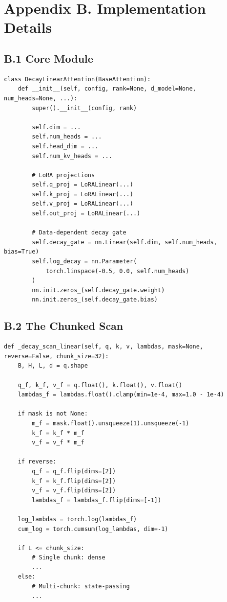 \section{Appendix B. Implementation Details}

\subsection{B.1 Core Module}

\begin{lstlisting}
class DecayLinearAttention(BaseAttention):
    def __init__(self, config, rank=None, d_model=None, num_heads=None, ...):
        super().__init__(config, rank)
        
        self.dim = ...
        self.num_heads = ...
        self.head_dim = ...
        self.num_kv_heads = ...
        
        # LoRA projections
        self.q_proj = LoRALinear(...)
        self.k_proj = LoRALinear(...)
        self.v_proj = LoRALinear(...)
        self.out_proj = LoRALinear(...)
        
        # Data-dependent decay gate
        self.decay_gate = nn.Linear(self.dim, self.num_heads, bias=True)
        self.log_decay = nn.Parameter(
            torch.linspace(-0.5, 0.0, self.num_heads)
        )
        nn.init.zeros_(self.decay_gate.weight)
        nn.init.zeros_(self.decay_gate.bias)
\end{lstlisting}

\subsection{B.2 The Chunked Scan}

\begin{lstlisting}
def _decay_scan_linear(self, q, k, v, lambdas, mask=None, reverse=False, chunk_size=32):
    B, H, L, d = q.shape
    
    q_f, k_f, v_f = q.float(), k.float(), v.float()
    lambdas_f = lambdas.float().clamp(min=1e-4, max=1.0 - 1e-4)
    
    if mask is not None:
        m_f = mask.float().unsqueeze(1).unsqueeze(-1)
        k_f = k_f * m_f
        v_f = v_f * m_f
    
    if reverse:
        q_f = q_f.flip(dims=[2])
        k_f = k_f.flip(dims=[2])
        v_f = v_f.flip(dims=[2])
        lambdas_f = lambdas_f.flip(dims=[-1])
    
    log_lambdas = torch.log(lambdas_f)
    cum_log = torch.cumsum(log_lambdas, dim=-1)
    
    if L <= chunk_size:
        # Single chunk: dense
        ...
    else:
        # Multi-chunk: state-passing
        ...
\end{lstlisting}

